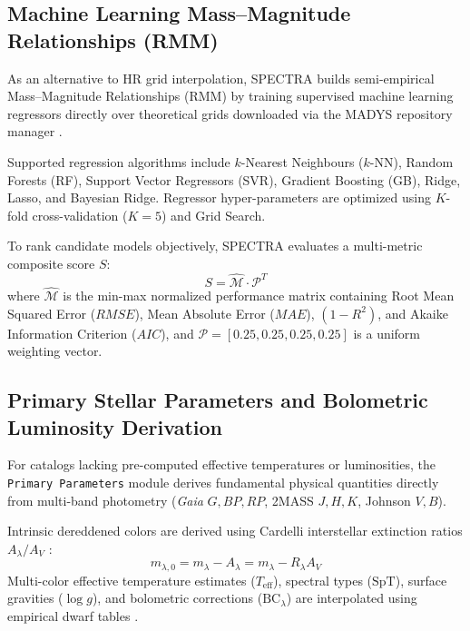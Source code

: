 \documentclass[preprints,article,submit,moreauthors,pdftex]{Definitions/mdpi}
\begin{document}
\subsection{Machine Learning Mass--Magnitude Relationships (RMM)}
\label{sec:rmm}

As an alternative to HR grid interpolation, \textsc{SPECTRA} builds semi-empirical Mass--Magnitude Relationships (RMM) by training supervised machine learning regressors directly over theoretical grids downloaded via the \textsc{MADYS} repository manager \citep{lodieu2019fiveD}.

Supported regression algorithms include $k$-Nearest Neighbours ($k$-NN), Random Forests (RF), Support Vector Regressors (SVR), Gradient Boosting (GB), Ridge, Lasso, and Bayesian Ridge. Regressor hyper-parameters are optimized using $K$-fold cross-validation ($K=5$) and Grid Search.

To rank candidate models objectively, \textsc{SPECTRA} evaluates a multi-metric composite score $S$:
\begin{equation}
    S = \hat{\mathcal{M}} \cdot \mathcal{P}^T
    \label{eq:composite_score}
\end{equation}
where $\hat{\mathcal{M}}$ is the min-max normalized performance matrix containing Root Mean Squared Error ($RMSE$), Mean Absolute Error ($MAE$), $(1 - R^2)$, and Akaike Information Criterion ($AIC$), and $\mathcal{P} = [0.25, 0.25, 0.25, 0.25]$ is a uniform weighting vector.


\subsection{Primary Stellar Parameters and Bolometric Luminosity Derivation}
\label{sec:primary_params}

For catalogs lacking pre-computed effective temperatures or luminosities, the \texttt{Primary Parameters} module derives fundamental physical quantities directly from multi-band photometry (\textit{Gaia} $G, BP, RP$, 2MASS $J, H, K$, Johnson $V, B$).

Intrinsic dereddened colors are derived using Cardelli interstellar extinction ratios $A_\lambda / A_V$ \citep{cardelli1989relationship}:
\begin{equation}
    m_{\lambda,0} = m_\lambda - A_\lambda = m_\lambda - R_\lambda A_V
    \label{eq:dereddening}
\end{equation}
Multi-color effective temperature estimates ($T_{\text{eff}}$), spectral types ($\text{SpT}$), surface gravities ($\log g$), and bolometric corrections ($\text{BC}_\lambda$) are interpolated using empirical dwarf tables \citep{pecaut2013intrinsic}.
\end{document}
